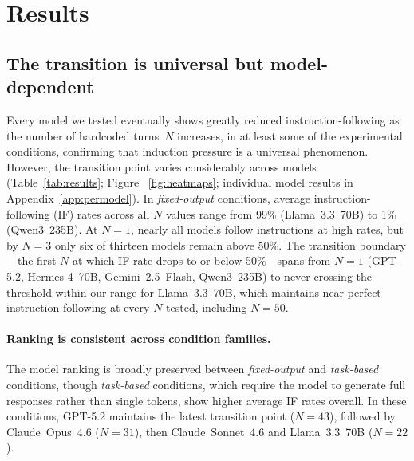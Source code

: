 
\section{Results}
\label{sec:results}



\subsection{The transition is universal but model-dependent}
\label{sec:transition}

Every model we tested eventually shows greatly reduced instruction-following as the number of hardcoded turns~$N$ increases, in at least some of the experimental conditions, confirming that induction pressure is a universal phenomenon. However, the transition point varies considerably across models (Table~\ref{tab:results}; Figure ~\ref{fig:heatmaps}; individual model results in Appendix~\ref{app:permodel}). In \emph{fixed-output} conditions, average instruction-following (IF) rates across all $N$ values range from 99\% (Llama~3.3~70B) to 1\% (Qwen3~235B). At $N{=}1$, nearly all models follow instructions at high rates, but by $N{=}3$ only six of thirteen models remain above 50\%. The transition boundary---the first $N$ at which IF rate drops to or below 50\%---spans from $N{=}1$ (GPT-5.2, Hermes-4~70B, Gemini~2.5~Flash, Qwen3~235B) to never crossing the threshold within our range for Llama~3.3~70B, which maintains near-perfect instruction-following at every $N$ tested, including $N{=}50$.

\paragraph{Ranking is consistent across condition families.}
The model ranking is broadly preserved between \emph{fixed-output} and \emph{task-based} conditions, though \emph{task-based} conditions, which require the model to generate full responses rather than single tokens, show higher average IF rates overall. In these conditions, GPT-5.2 maintains the latest transition point ($N{=}43$), followed by Claude~Opus~4.6 ($N{=}31$), then Claude~Sonnet~4.6 and Llama~3.3~70B ($N{=}22$).

